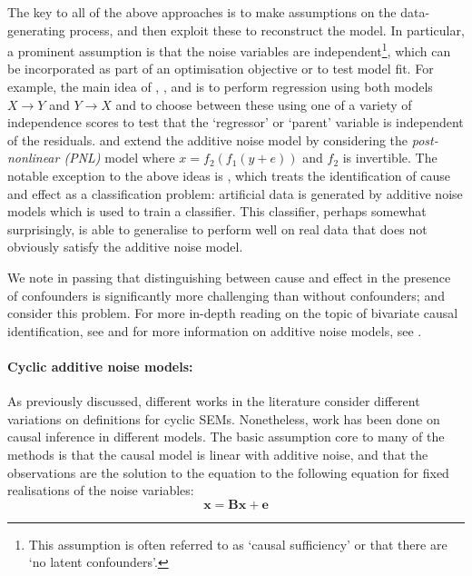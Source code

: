 The key to all of the above approaches is to make assumptions on the data-generating process, and then exploit these to reconstruct the model. In particular, a prominent assumption is that the noise variables are independent\footnote{This assumption is often referred to as `causal sufficiency' or that there are `no latent confounders'.}, which can be incorporated as part of an optimisation objective or to test model fit. For example, the main idea of \cite{hoyer2009nonlinear}, \cite{peters2014causal}, \cite{peters2010identifying} and \cite{mooij2010distinguishing} is to perform regression using both models $X \longrightarrow Y$ and $Y \longrightarrow X$ and to choose between these using one of a variety of independence scores to test that the `regressor' or `parent' variable is independent of the residuals. \cite{zhang2008distinguishing} and \cite{zhang2009identifiability} extend the additive noise model by considering the \emph{post-nonlinear (PNL)} model where $x = f_2(f_1(y+e))$ and $f_2$ is invertible. The notable exception to the above ideas is \cite{lopez2015towards}, which treats the identification of cause and effect as a classification problem: artificial data is generated by additive noise models which is used to train a classifier. This classifier, perhaps somewhat surprisingly, is able to generalise to perform well on real data that does not obviously satisfy the additive noise model.

We note in passing that distinguishing between cause and effect in the presence of confounders is significantly more challenging than without confounders; \cite{hoyer2008estimation} and \cite{janzing2009identifying} consider this problem.  For more in-depth reading on the topic of bivariate causal identification, see \cite{mooij2014distinguishing} and for more information on additive noise models, see \cite{peters2014causal}.


\paragraph{Cyclic additive noise models:}
As previously discussed, different works in the literature consider different variations on definitions for cyclic SEMs. 
Nonetheless, work has been done on causal inference in different models. 
The basic assumption core to many of the methods is that the causal model is linear with additive noise, and that the observations are the solution to the equation to the following equation for fixed realisations of the noise variables:
\[ \mathbf{x} = \mathbf{B}\mathbf{x} + \mathbf{e}\]

